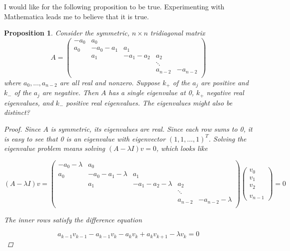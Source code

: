 \documentclass[12pt]{article}
\newtheorem{proposition}{Proposition}
\begin{document}
I would like for the following proposition to be true. Experimenting with Mathematica leads me to believe that it is true.

\begin{proposition}
Consider the symmetric, $n \times n$ tridiagonal matrix
\begin{equation}
A = \begin{pmatrix}
- a_0 & a_0 & & &  \\
a_0 & -a_0 - a_1 &  a_1 \\
& a_1 & -a_1 - a_2  &  a_2 \\
& & & \ddots \\
& & & a_{n-2} & -a_{n-2} \\
\end{pmatrix} 
\end{equation}
where $a_0, \dots, a_{n-2}$ are all real and nonzero. Suppose $k_+$ of the $a_j$ are positive and $k_-$ of the $a_j$ are negative. Then $A$ has a single eigenvalue at 0, $k_+$ negative real eigenvalues, and $k_-$ positive real eigenvalues. The eigenvalues might also be distinct?
\begin{proof}
Since $A$ is symmetric, its eigenvalues are real. Since each row sums to 0, it is easy to see that 0 is an eigenvalue with eigenvector $(1, 1, \dots, 1)^T$. Solving the eigenvalue problem means solving $(A - \lambda I)v = 0$, which looks like

\begin{equation}
(A - \lambda I)v = \begin{pmatrix}
- a_0 - \lambda & a_0 & & &  \\
a_0 & -a_0 - a_1 - \lambda &  a_1 \\
& a_1 & -a_1 - a_2 - \lambda &  a_2 \\
& & & \ddots \\
& & & a_{n-2} & -a_{n-2} - \lambda\\
\end{pmatrix} 
\begin{pmatrix}v_0 \\ v_1 \\ v_2 \\ \\ v_{n-1} \end{pmatrix} = 0
\end{equation}

The inner rows satisfy the difference equation

\begin{equation}
a_{k-1} v_{k-1} - a_{k-1} v_k - a_k v_k + a_k v_{k+1} - \lambda v_k = 0
\end{equation}


\end{proof}
\end{proposition}
\end{document}
